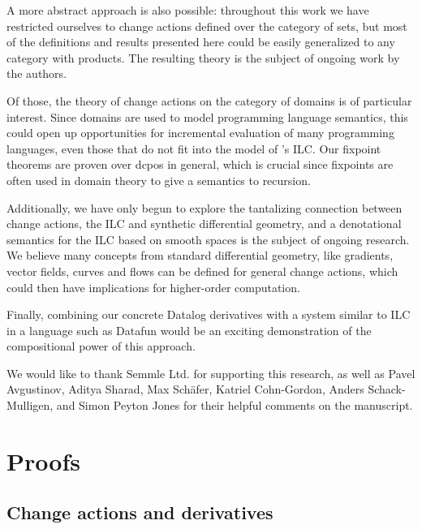 A more abstract approach is also possible: throughout this work we have restricted ourselves
to change actions defined over the category of sets, but most of the definitions and results
presented here could be easily generalized to any category with products. The resulting theory
is the subject of ongoing work by the authors.

Of those, the theory of change actions on the category of domains is of particular interest. Since
domains are used to model programming language semantics, this could
open up opportunities for incremental evaluation of many programming languages,
even those that do not fit into the model of \citeauthor{cai2014changes}'s ILC.
Our fixpoint theorems are proven over dcpos in general, which is crucial since
fixpoints are often used in domain theory to give a semantics to recursion.

Additionally, we have only begun to explore the tantalizing connection between
change actions, the ILC and synthetic
differential geometry, and a denotational semantics for the
ILC based on smooth spaces is the subject of ongoing research. We believe many concepts
from standard differential geometry, like gradients, vector fields, curves and flows can
be defined for general change actions, which could then have implications for higher-order
computation.

Finally, combining our concrete Datalog derivatives with a system similar to ILC
in a language such as Datafun would be an exciting demonstration of the compositional
power of this approach.

\begin{acks}

We would like to thank Semmle Ltd. for supporting this research, as well as Pavel
Avgustinov, Aditya Sharad, Max Sch\"afer, Katriel Cohn-Gordon, Anders
Schack-Mulligen, and Simon Peyton Jones for their
helpful comments on the manuscript.

\end{acks}

\printbibliography

\clearpage
\appendix
\appendixpage
\section{Proofs}

\subsection{Change actions and derivatives}


